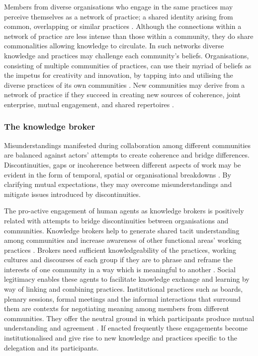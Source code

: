 \documentclass[graybox]{styles/svmult}
\begin{document}
Members from diverse organisations who engage in the same practices may perceive themselves as a network of practice; a shared identity arising from common, overlapping or similar practices \citep{brown2001knowledge}. Although the connections within a network of practice are less intense than those within a community, they do share commonalities allowing knowledge to circulate. In such networks diverse knowledge and practices may challenge each community's beliefs. 
Organisations, consisting of multiple communities of practices, can use their myriad of beliefs as the impetus for creativity and innovation, by tapping into and utilising the diverse practices of its own communities \citep{BroDug2000aa}. New communities may derive from a network of practice if they succeed in creating new sources of coherence, joint enterprise, mutual engagement, and shared repertoires \citep{Wen1999aa}.

\subsubsection{The knowledge broker}
Misunderstandings manifested during collaboration among different communities are balanced against actors' attempts to create coherence and bridge differences. 
Discontinuities, gaps or incoherence between different aspects of work may be evident in the form of temporal, spatial or organisational breakdowns \citep{beth2002discontinuities}. 
By clarifying mutual expectations, they may overcome misunderstandings and mitigate issues introduced by discontinuities. 

The pro-active engagement of human agents as knowledge brokers is positively related with attempts to bridge discontinuities between organisations and communities. Knowledge brokers help to generate shared tacit understanding among communities \citep{walsham2005knowledge} and increase awareness of other functional areas' working practices \citep{hayes2000work}. Brokers need sufficient knowledgeability of the practices, working cultures and discourses of each group if they are to phrase and reframe the interests of one community in a way which is meaningful to another \citep{BroDug2000aa}. Social legitimacy enables these agents to facilitate knowledge exchange and learning by way of linking and combining practices. Institutional practices such as boards, plenary sessions, formal meetings and the informal interactions that surround them are contexts for negotiating meaning among members from different communities. They offer the neutral ground in which participants produce mutual understanding and agreement \citep{Wen1999aa}. If enacted frequently these engagements become institutionalised and give rise to new knowledge and practices specific to the delegation and its participants. 
\end{document}
